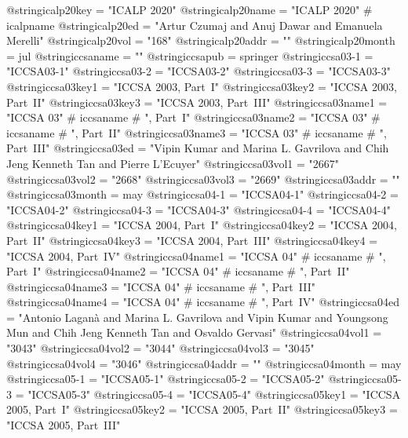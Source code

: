 @string{icalp20key =            "ICALP 2020"}
@string{icalp20name =           "ICALP 2020" # icalpname}
@string{icalp20ed =             "Artur Czumaj and Anuj Dawar and Emanuela Merelli"}
@string{icalp20vol =            "168"}
@string{icalp20addr =           ""}
@string{icalp20month =          jul}
@string{iccsaname =             ""}
@string{iccsapub =              springer}
@string{iccsa03-1 =             "ICCSA03-1"}
@string{iccsa03-2 =             "ICCSA03-2"}
@string{iccsa03-3 =             "ICCSA03-3"}
@string{iccsa03key1 =           "ICCSA 2003, Part~I"}
@string{iccsa03key2 =           "ICCSA 2003, Part~II"}
@string{iccsa03key3 =           "ICCSA 2003, Part~III"}
@string{iccsa03name1 =          "ICCSA 03" # iccsaname # ", Part~I"}
@string{iccsa03name2 =          "ICCSA 03" # iccsaname # ", Part~II"}
@string{iccsa03name3 =          "ICCSA 03" # iccsaname # ", Part~III"}
@string{iccsa03ed =             "Vipin Kumar and Marina L. Gavrilova and Chih Jeng Kenneth Tan and Pierre {L'Ecuyer}"}
@string{iccsa03vol1 =           "2667"}
@string{iccsa03vol2 =           "2668"}
@string{iccsa03vol3 =           "2669"}
@string{iccsa03addr =           ""}
@string{iccsa03month =          may}
@string{iccsa04-1 =             "ICCSA04-1"}
@string{iccsa04-2 =             "ICCSA04-2"}
@string{iccsa04-3 =             "ICCSA04-3"}
@string{iccsa04-4 =             "ICCSA04-4"}
@string{iccsa04key1 =           "ICCSA 2004, Part~I"}
@string{iccsa04key2 =           "ICCSA 2004, Part~II"}
@string{iccsa04key3 =           "ICCSA 2004, Part~III"}
@string{iccsa04key4 =           "ICCSA 2004, Part~IV"}
@string{iccsa04name1 =          "ICCSA 04" # iccsaname # ", Part~I"}
@string{iccsa04name2 =          "ICCSA 04" # iccsaname # ", Part~II"}
@string{iccsa04name3 =          "ICCSA 04" # iccsaname # ", Part~III"}
@string{iccsa04name4 =          "ICCSA 04" # iccsaname # ", Part~IV"}
@string{iccsa04ed =             "Antonio Lagan{\`a} and Marina L. Gavrilova and Vipin Kumar and Youngsong Mun and Chih Jeng Kenneth Tan and Osvaldo Gervasi"}
@string{iccsa04vol1 =           "3043"}
@string{iccsa04vol2 =           "3044"}
@string{iccsa04vol3 =           "3045"}
@string{iccsa04vol4 =           "3046"}
@string{iccsa04addr =           ""}
@string{iccsa04month =          may}
@string{iccsa05-1 =             "ICCSA05-1"}
@string{iccsa05-2 =             "ICCSA05-2"}
@string{iccsa05-3 =             "ICCSA05-3"}
@string{iccsa05-4 =             "ICCSA05-4"}
@string{iccsa05key1 =           "ICCSA 2005, Part~I"}
@string{iccsa05key2 =           "ICCSA 2005, Part~II"}
@string{iccsa05key3 =           "ICCSA 2005, Part~III"}

